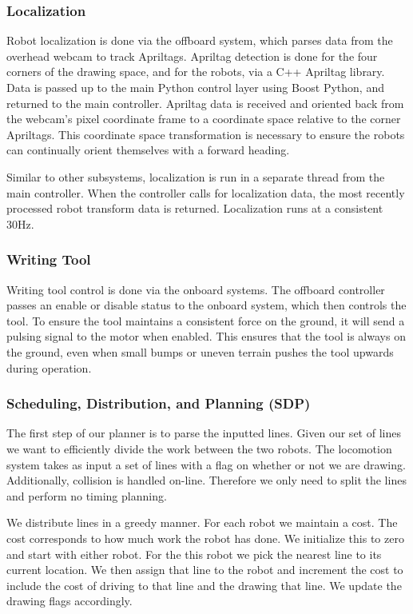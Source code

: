 \subsubsection{Localization}
\label{sec:sw_localization}
Robot localization is done via the offboard system, which parses data from the overhead webcam to track Apriltags. Apriltag detection is done for the four corners of the drawing space, and for the robots, via a C++ Apriltag library. Data is passed up to the main Python control layer using Boost Python, and returned to the main controller. Apriltag data is received and oriented back from the webcam's pixel coordinate frame to a coordinate space relative to the corner Apriltags. This coordinate space transformation is necessary to ensure the robots can continually orient themselves with a forward heading.

Similar to other subsystems, localization is run in a separate thread from the main controller. When the controller calls for localization data, the most recently processed robot transform data is returned. Localization runs at a consistent 30Hz.

\subsubsection{Writing Tool}
\label{sec:sw_writing}
Writing tool control is done via the onboard systems. The offboard controller passes an enable or disable status to the onboard system, which then controls the tool. To ensure the tool maintains a consistent force on the ground, it will send a pulsing signal to the motor when enabled. This ensures that the tool is always on the ground, even when small bumps or uneven terrain pushes the tool upwards during operation.

\subsubsection{Scheduling, Distribution, and Planning (SDP)}
\label{sec:sw_sdp}

The first step of our planner is to parse the inputted lines.
Given our set of lines we want to efficiently divide the work between the two robots.
The locomotion system takes as input a set of lines with a flag on whether or not we are drawing.
Additionally, collision is handled on-line.
Therefore we only need to split the lines and perform no timing planning.

We distribute lines in a greedy manner.
For each robot we maintain a cost.
The cost corresponds to how much work the robot has done.
We initialize this to zero and start with either robot.
For the this robot we pick the nearest line to its current location.
We then assign that line to the robot and increment the cost to include the cost of driving to that line and the drawing that line.
We update the drawing flags accordingly.


